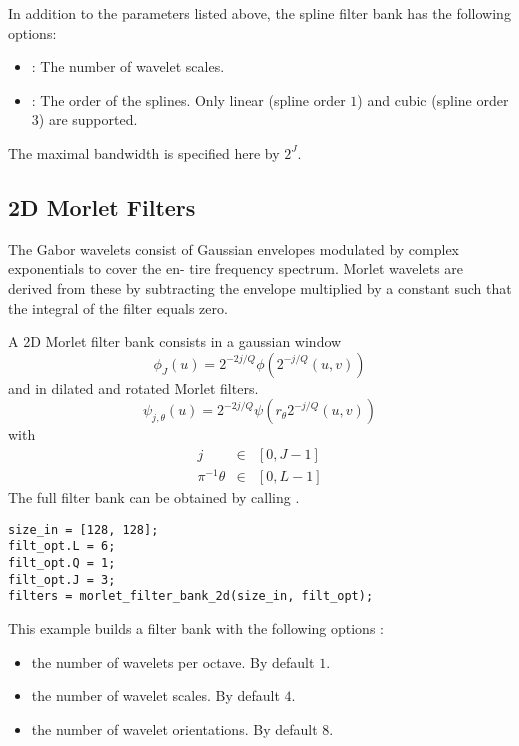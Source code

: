 \documentclass[twocolumn]{article}
\begin{document}
In addition to the parameters listed above, the spline filter bank has the following options:
\begin{itemize}
	\item {}: The number of wavelet scales.
	\item {}: The order of the splines. Only linear (spline order $1$) and cubic (spline order $3$) are supported.
\end{itemize}
The maximal bandwidth is specified here by $2^J$.

\subsection{2D Morlet Filters}
\label{sec_filters_2d}
The Gabor wavelets consist of Gaussian envelopes modulated by complex exponentials to cover the en- tire frequency spectrum. Morlet wavelets are derived from these by subtracting the envelope multiplied by a constant such that the integral of the filter equals zero. 

A 2D Morlet filter bank consists in a gaussian window 
\begin{equation}
\phi_J (u) =  2^{-2j/Q} \phi(2^{-j/Q} (u,v))
\end{equation}
and in dilated and rotated Morlet filters.
\begin{equation}
\psi_{j, \theta}(u) = 2^{-2j/Q} \psi(r_\theta 2^{-j/Q} (u,v)) 
\end{equation}
with 
\begin{eqnarray}
j & \in & [0,J-1] \\
\pi^{-1} \theta & \in & [0,L-1]
\end{eqnarray}
The full filter bank can be obtained by calling 
. 
\begin{lstlisting}
size_in = [128, 128];
filt_opt.L = 6;
filt_opt.Q = 1;
filt_opt.J = 3;
filters = morlet_filter_bank_2d(size_in, filt_opt);
\end{lstlisting}
This example builds a  filter bank with the following options :
\begin{itemize}
	\item {} the number of wavelets per octave. By default $1$.
	\item {}  the number of wavelet scales. By default $4$.
	\item {}  the number of wavelet orientations. By default $8$.
\end{itemize}	
\end{document}
